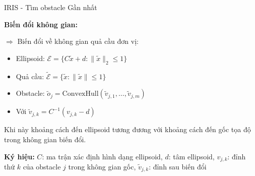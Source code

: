 \documentclass[aspectratio=169]{beamer}
\begin{document}
\begin{frame}{IRIS - Tìm obstacle Gần nhất}

        \textbf{Biến đổi không gian:}
        
        \vspace{0.5em}
        $\Rightarrow$ Biến đổi về không gian quả cầu đơn vị:
        
        \begin{itemize}
            \item Ellipsoid: $\mathcal{E} = \{C\tilde{x} + d : \|\tilde{x}\|_2 \leq 1\}$
            \item Quả cầu: $\tilde{\mathcal{E}} = \{\tilde{x} : \|\tilde{x}\| \leq 1\}$
            \item Obstacle: $\tilde{o}_j = \text{ConvexHull}(\tilde{v}_{j,1}, \ldots, \tilde{v}_{j,m})$
            \item Với $\tilde{v}_{j,k} = C^{-1}(v_{j,k} - d)$
        \end{itemize}

        Khi này khoảng cách đến ellipsoid tương đương với khoảng cách đến gốc tọa độ trong không gian biến đổi.
        
        \vspace{0.3em}
        {\small
        \textbf{Ký hiệu:}
        $C$: ma trận xác định hình dạng ellipsoid,
        $d$: tâm ellipsoid,
        $v_{j,k}$: đỉnh thứ $k$ của obstacle $j$ trong không gian gốc,
        $\tilde{v}_{j,k}$: đỉnh sau biến đổi
        }
\end{frame}
\end{document}
